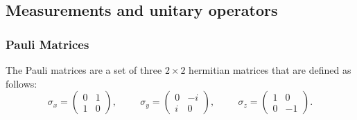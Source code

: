 \subsection{Measurements and unitary operators}




\subsubsection{Pauli Matrices}
The Pauli matrices are a set of three $2 \times 2$ hermitian matrices that are defined as follows:
\begin{equation*}
  \sigma_{x} = \begin{pmatrix} 0 & 1\\ 1 & 0 \end{pmatrix}, \hspace{1cm} \sigma_{y} = \begin{pmatrix} 0 & -i\\ i & 0 \end{pmatrix}, \hspace{1cm} \sigma_{z} = \begin{pmatrix} 1 & 0\\ 0 & -1 \end{pmatrix}.
\end{equation*}

